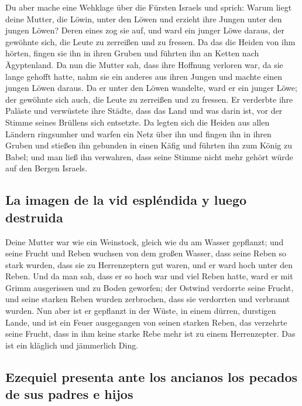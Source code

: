  Du aber mache eine Wehklage über die Fürsten Israels
 und sprich: Warum liegt deine Mutter, die Löwin, unter
den Löwen und erzieht ihre Jungen unter den jungen Löwen? 
Deren eines zog sie auf, und ward ein junger Löwe daraus, der gewöhnte
sich, die Leute zu zerreißen und zu fressen.  Da das die
Heiden von ihm hörten, fingen sie ihn in ihren Gruben und führten ihn an
Ketten nach Ägyptenland.  Da nun die Mutter sah, dass ihre
Hoffnung verloren war, da sie lange gehofft hatte, nahm sie ein anderes
aus ihren Jungen und machte einen jungen Löwen daraus.  Da
er unter den Löwen wandelte, ward er ein junger Löwe; der gewöhnte sich
auch, die Leute zu zerreißen und zu fressen.  Er verderbte
ihre Paläste und verwüstete ihre Städte, dass das Land und was darin
ist, vor der Stimme seines Brüllens sich entsetzte.  Da
legten sich die Heiden aus allen Ländern ringsumher und warfen ein Netz
über ihn und fingen ihn in ihren Gruben  und stießen ihn
gebunden in einen Käfig und führten ihn zum König zu Babel; und man ließ
ihn verwahren, dass seine Stimme nicht mehr gehört würde auf den Bergen
Israels.

\hypertarget{la-imagen-de-la-vid-espluxe9ndida-y-luego-destruida}{%
\subsection{La imagen de la vid espléndida y luego
destruida}\label{la-imagen-de-la-vid-espluxe9ndida-y-luego-destruida}}

 Deine Mutter war wie ein Weinstock, gleich wie du am
Wasser gepflanzt; und seine Frucht und Reben wuchsen von dem großen
Wasser,  dass seine Reben so stark wurden, dass sie zu
Herrenzeptern gut waren, und er ward hoch unter den Reben. Und da man
sah, dass er so hoch war und viel Reben hatte,  ward er
mit Grimm ausgerissen und zu Boden geworfen; der Ostwind verdorrte seine
Frucht, und seine starken Reben wurden zerbrochen, dass sie verdorrten
und verbrannt wurden.  Nun aber ist er gepflanzt in der
Wüste, in einem dürren, durstigen Lande,  und ist ein
Feuer ausgegangen von seinen starken Reben, das verzehrte seine Frucht,
dass in ihm keine starke Rebe mehr ist zu einem Herrenzepter. Das ist
ein kläglich und jämmerlich Ding.

\hypertarget{ezequiel-presenta-ante-los-ancianos-los-pecados-de-sus-padres-e-hijos}{%
\subsection{Ezequiel presenta ante los ancianos los pecados de sus
padres e
hijos}\label{ezequiel-presenta-ante-los-ancianos-los-pecados-de-sus-padres-e-hijos}}

